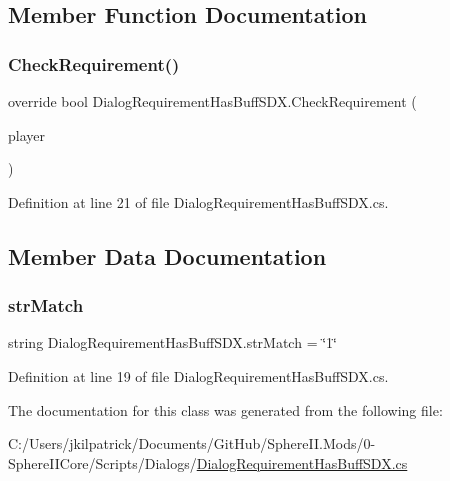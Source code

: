 \subsection{Member Function Documentation}
\mbox{\label{class_dialog_requirement_has_buff_s_d_x_ac1b8f053e4c78283f56aa342360d48bc}} 
\subsubsection{\texorpdfstring{CheckRequirement()}{CheckRequirement()}}
{\footnotesize\ttfamily override bool Dialog\+Requirement\+Has\+Buff\+S\+D\+X.\+Check\+Requirement (\begin{DoxyParamCaption}\item[{Entity\+Player}]{player }\end{DoxyParamCaption})}



Definition at line 21 of file Dialog\+Requirement\+Has\+Buff\+S\+D\+X.\+cs.



\subsection{Member Data Documentation}
\mbox{\label{class_dialog_requirement_has_buff_s_d_x_a38b5f555e5846a5d789ea75d71c1249e}} 
\subsubsection{\texorpdfstring{strMatch}{strMatch}}
{\footnotesize\ttfamily string Dialog\+Requirement\+Has\+Buff\+S\+D\+X.\+str\+Match = \char`\"{}1\char`\"{}}



Definition at line 19 of file Dialog\+Requirement\+Has\+Buff\+S\+D\+X.\+cs.



The documentation for this class was generated from the following file\+:\begin{DoxyCompactItemize}
\item 
C\+:/\+Users/jkilpatrick/\+Documents/\+Git\+Hub/\+Sphere\+I\+I.\+Mods/0-\/\+Sphere\+I\+I\+Core/\+Scripts/\+Dialogs/\mbox{\hyperlink{_dialog_requirement_has_buff_s_d_x_8cs}{Dialog\+Requirement\+Has\+Buff\+S\+D\+X.\+cs}}\end{DoxyCompactItemize}
